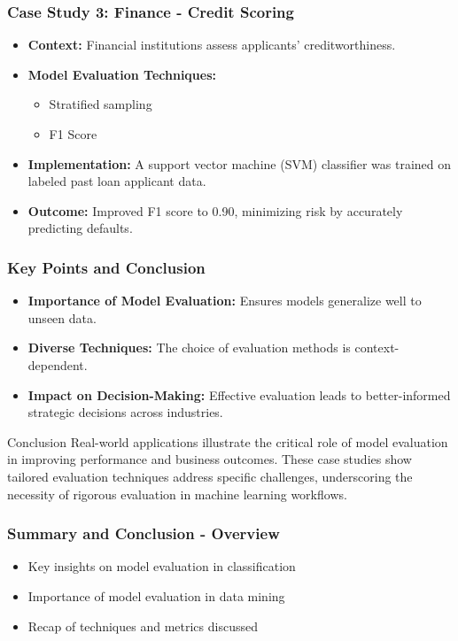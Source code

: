 \documentclass[aspectratio=169]{beamer}
\begin{document}
\begin{frame}[fragile]
    \frametitle{Case Study 3: Finance - Credit Scoring}
    \begin{itemize}
        \item \textbf{Context:} Financial institutions assess applicants' creditworthiness.
        \item \textbf{Model Evaluation Techniques:}
        \begin{itemize}
            \item Stratified sampling
            \item F1 Score
        \end{itemize}
        \item \textbf{Implementation:} A support vector machine (SVM) classifier was trained on labeled past loan applicant data.
        \item \textbf{Outcome:} Improved F1 score to 0.90, minimizing risk by accurately predicting defaults.
    \end{itemize}
\end{frame}

\begin{frame}[fragile]
    \frametitle{Key Points and Conclusion}
    \begin{itemize}
        \item \textbf{Importance of Model Evaluation:} Ensures models generalize well to unseen data.
        \item \textbf{Diverse Techniques:} The choice of evaluation methods is context-dependent.
        \item \textbf{Impact on Decision-Making:} Effective evaluation leads to better-informed strategic decisions across industries.
    \end{itemize}
    \begin{block}{Conclusion}
        Real-world applications illustrate the critical role of model evaluation in improving performance and business outcomes. These case studies show tailored evaluation techniques address specific challenges, underscoring the necessity of rigorous evaluation in machine learning workflows.
    \end{block}
\end{frame}

\begin{frame}[fragile]
    \frametitle{Summary and Conclusion - Overview}
    \begin{itemize}
        \item Key insights on model evaluation in classification
        \item Importance of model evaluation in data mining
        \item Recap of techniques and metrics discussed
    \end{itemize}
\end{frame}
\end{document}
